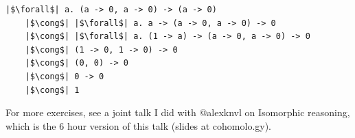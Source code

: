 \documentclass[tikz]{beamer}
\theoremstyle{definition}
\begin{document}
\begin{frame}[fragile]
\begin{verbatim}
|$\forall$| a. (a -> 0, a -> 0) -> (a -> 0)
    |$\cong$| |$\forall$| a. a -> (a -> 0, a -> 0) -> 0
    |$\cong$| |$\forall$| a. (1 -> a) -> (a -> 0, a -> 0) -> 0
    |$\cong$| (1 -> 0, 1 -> 0) -> 0
    |$\cong$| (0, 0) -> 0
    |$\cong$| 0 -> 0
    |$\cong$| 1
\end{verbatim}
\end{frame}

\frame
{
	For more exercises, see a joint talk I did with @alexknvl on Isomorphic reasoning, which is the 6 hour version of this talk (slides at cohomolo.gy). 
}
\end{document}
